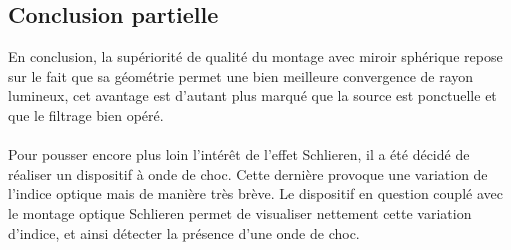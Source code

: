 \subsection{Conclusion partielle}
En conclusion, la supériorité de qualité du montage avec miroir sphérique repose sur le fait que sa géométrie permet une bien meilleure convergence de rayon lumineux, cet avantage est d’autant plus marqué que la source est ponctuelle et que le filtrage bien opéré.
\\\\
Pour pousser encore plus loin l'intérêt de l’effet Schlieren, il a été décidé de réaliser un dispositif à onde de choc. Cette dernière provoque une variation de l’indice optique mais de manière très brève. Le dispositif en question couplé avec le montage optique Schlieren permet de visualiser nettement cette variation d’indice, et ainsi détecter la présence d’une onde de choc.  